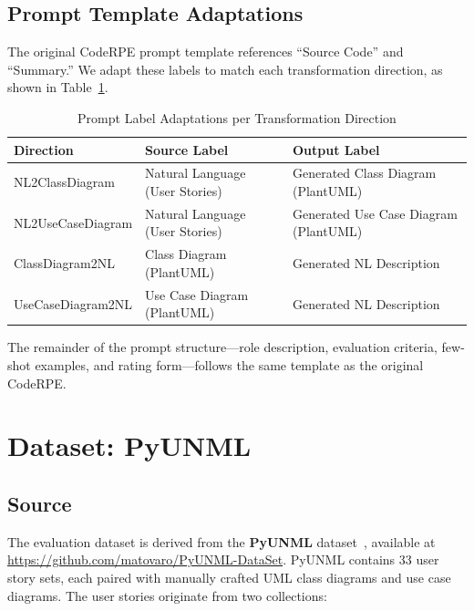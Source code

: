 \documentclass[lettersize,journal]{IEEEtran}
\begin{document}
\subsection{Prompt Template Adaptations}

The original CodeRPE prompt template references ``Source Code'' and ``Summary.'' We adapt these labels to match each transformation direction, as shown in Table~\ref{tab:prompt-labels}.

\begin{table}[!t]
\centering
\caption{Prompt Label Adaptations per Transformation Direction}
\label{tab:prompt-labels}
\begin{tabular}{@{}p{2.2cm}p{2.5cm}p{2.8cm}@{}}
\toprule
\textbf{Direction} & \textbf{Source Label} & \textbf{Output Label} \\
\midrule
NL2Class\-Diagram & Natural Language (User Stories) & Generated Class Diagram (PlantUML) \\
\addlinespace
NL2UseCase\-Diagram & Natural Language (User Stories) & Generated Use Case Diagram (PlantUML) \\
\addlinespace
ClassDiagram\-2NL & Class Diagram (PlantUML) & Generated NL Description \\
\addlinespace
UseCaseDiagram\-2NL & Use Case Diagram (PlantUML) & Generated NL Description \\
\bottomrule
\end{tabular}
\end{table}

The remainder of the prompt structure---role description, evaluation criteria, few-shot examples, and rating form---follows the same template as the original CodeRPE.

\section{Dataset: PyUNML}
\label{sec:dataset}

\subsection{Source}

The evaluation dataset is derived from the \textbf{PyUNML} dataset~\cite{pyunml}, available at \url{https://github.com/matovaro/PyUNML-DataSet}. PyUNML contains 33 user story sets, each paired with manually crafted UML class diagrams and use case diagrams. The user stories originate from two collections:
\end{document}

